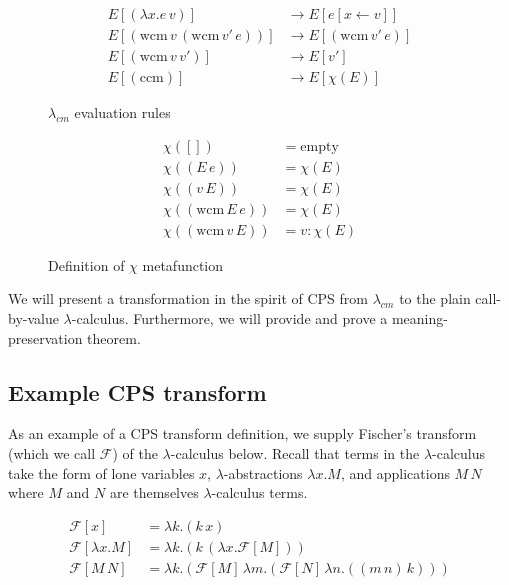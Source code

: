 \documentclass[11pt,ms]{byuprop}
\newcounter{definition}
\newcounter{example}
\begin{document}
\begin{figure}
\begin{align*}
E[(\lambda x.e\,v)]                         &\rightarrow E[e[x\leftarrow v]]\\
E[(\mathrm{wcm}\,v\,(\mathrm{wcm}\,v'\,e))] &\rightarrow E[(\mathrm{wcm}\,v'\,e)]\\
E[(\mathrm{wcm}\,v\,v')]                    &\rightarrow E[v']\\
E[(\mathrm{ccm})]                           &\rightarrow E[\chi(E)]
\end{align*}
\caption{$\lambda_{cm}$ evaluation rules}
\label{language-semantics}
\end{figure}

\begin{figure}
\begin{align*}
\chi([])                   &= \mathrm{empty}\\
\chi((E\,e))               &= \chi(E)\\
\chi((v\,E))               &= \chi(E)\\
\chi((\mathrm{wcm}\,E\,e)) &= \chi(E)\\
\chi((\mathrm{wcm}\,v\,E)) &= v : \chi(E)
\end{align*}
\caption{Definition of $\chi$ metafunction}
\label{chi-metafunction}
\end{figure}

We will present a transformation in the spirit of CPS from $\lambda_{cm}$ to 
the plain call-by-value $\lambda$-calculus. Furthermore, we will provide and 
prove a meaning-preservation theorem.

\subsection{Example CPS transform}

As an example of a CPS transform definition, we supply Fischer's transform 
(which we call $\mathcal{F}$) of the $\lambda$-calculus 
\cite{fischer1972lambda} below. Recall that terms in 
the $\lambda$-calculus take the form of lone variables $x$, 
$\lambda$-abstractions $\lambda x.M$, and applications 
$M\,N$ where $M$ and $N$ are themselves $\lambda$-calculus terms.

\begin{align*}
\mathcal{F}[x]           &= \lambda k.(k\,x)\\
\mathcal{F}[\lambda x.M] &= \lambda k.(k\,(\lambda x.\mathcal{F}[M]))\\
\mathcal{F}[M\,N]        &= \lambda k.(\mathcal{F}[M]\,\lambda m.(\mathcal{F}[N]\,\lambda n.((m\,n)\,k)))
\end{align*}
\end{document}
